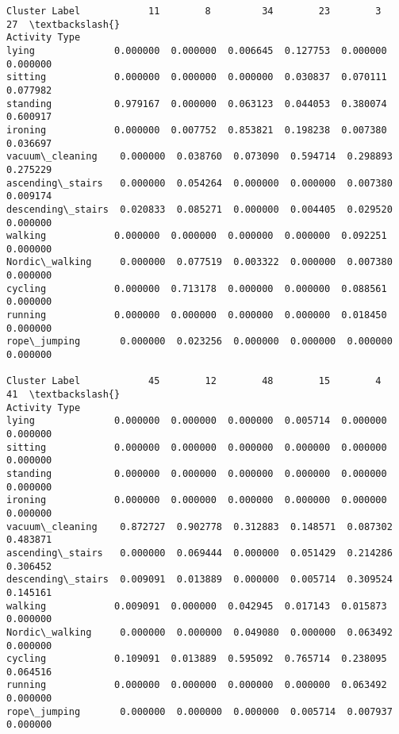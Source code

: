 \documentclass[11pt]{article}
\begin{document}
\begin{tcolorbox}[breakable, size=fbox, boxrule=.5pt, pad at break*=1mm, opacityfill=0]
\begin{Verbatim}[commandchars=\\\{\}]
Cluster Label            11        8         34        23        3         27  \textbackslash{}
Activity Type
lying              0.000000  0.000000  0.006645  0.127753  0.000000  0.000000
sitting            0.000000  0.000000  0.000000  0.030837  0.070111  0.077982
standing           0.979167  0.000000  0.063123  0.044053  0.380074  0.600917
ironing            0.000000  0.007752  0.853821  0.198238  0.007380  0.036697
vacuum\_cleaning    0.000000  0.038760  0.073090  0.594714  0.298893  0.275229
ascending\_stairs   0.000000  0.054264  0.000000  0.000000  0.007380  0.009174
descending\_stairs  0.020833  0.085271  0.000000  0.004405  0.029520  0.000000
walking            0.000000  0.000000  0.000000  0.000000  0.092251  0.000000
Nordic\_walking     0.000000  0.077519  0.003322  0.000000  0.007380  0.000000
cycling            0.000000  0.713178  0.000000  0.000000  0.088561  0.000000
running            0.000000  0.000000  0.000000  0.000000  0.018450  0.000000
rope\_jumping       0.000000  0.023256  0.000000  0.000000  0.000000  0.000000

Cluster Label            45        12        48        15        4         41  \textbackslash{}
Activity Type
lying              0.000000  0.000000  0.000000  0.005714  0.000000  0.000000
sitting            0.000000  0.000000  0.000000  0.000000  0.000000  0.000000
standing           0.000000  0.000000  0.000000  0.000000  0.000000  0.000000
ironing            0.000000  0.000000  0.000000  0.000000  0.000000  0.000000
vacuum\_cleaning    0.872727  0.902778  0.312883  0.148571  0.087302  0.483871
ascending\_stairs   0.000000  0.069444  0.000000  0.051429  0.214286  0.306452
descending\_stairs  0.009091  0.013889  0.000000  0.005714  0.309524  0.145161
walking            0.009091  0.000000  0.042945  0.017143  0.015873  0.000000
Nordic\_walking     0.000000  0.000000  0.049080  0.000000  0.063492  0.000000
cycling            0.109091  0.013889  0.595092  0.765714  0.238095  0.064516
running            0.000000  0.000000  0.000000  0.000000  0.063492  0.000000
rope\_jumping       0.000000  0.000000  0.000000  0.005714  0.007937  0.000000


\end{Verbatim}
\end{tcolorbox}
\end{document}

